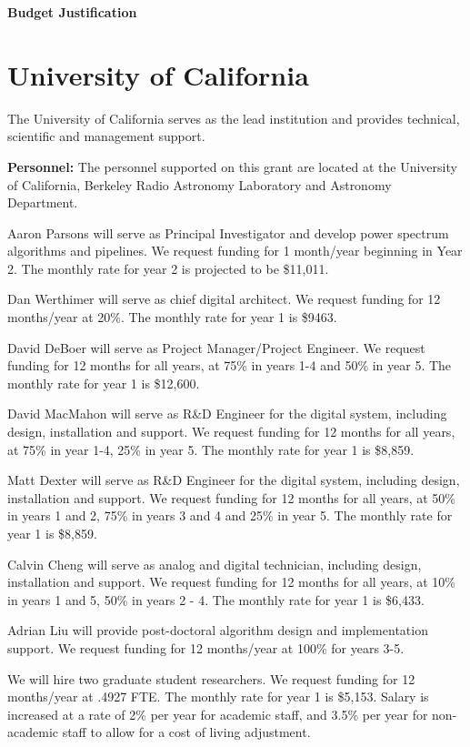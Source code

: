 \documentclass[onecolumn,11pt]{aastex}
\begin{document}
\begin{center}
{\bf \Large Budget Justification}
\end{center}

\section*{University of California}
The University of California serves as the lead institution and provides technical, scientific and management support.

{\bf Personnel:} 
The personnel supported on this grant are located at the University of California, Berkeley Radio Astronomy Laboratory and Astronomy Department.

Aaron Parsons will serve as Principal Investigator and develop power spectrum algorithms and pipelines. We request funding for 1 month/year beginning in Year 2. The monthly rate for year 2 is projected to be \$11,011.

Dan Werthimer will serve as chief digital architect.  We request funding for 12 months/year at 20\%.  The monthly rate for year 1 is \$9463.

David DeBoer will serve as Project Manager/Project Engineer. We request funding for 12 months for all years, at 75\% in years 1-4 and 50\% in year 5. The monthly rate for year 1 is \$12,600.

David MacMahon will serve as R\&D Engineer for the digital system, including design, installation and support. We request funding for 12 months for all years, at 75\% in year 1-4, 25\% in year 5. The monthly rate for year 1 is \$8,859.

Matt Dexter will serve as R\&D Engineer for the digital system, including design, installation and support. We request funding for 12 months for all years, at 50\% in years 1 and 2, 75\% in years 3 and 4 and 25\% in year 5. The monthly rate for year 1 is \$8,859.

Calvin Cheng will serve as analog and digital technician, including design, installation and support. We request funding for 12 months for all years, at 10\% in years 1 and 5, 50\% in years 2 - 4. The monthly rate for year 1 is \$6,433.

Adrian Liu will provide post-doctoral algorithm design and implementation support.  We request funding for 12 months/year at 100\% for years 3-5.

We will hire two graduate student researchers. We request funding for 12 months/year at .4927 FTE. The monthly rate for year 1 is \$5,153.
Salary is increased at a rate of 2\% per year for academic staff, and 3.5\% per year for non-academic staff to allow for a cost of living adjustment.
\end{document}
